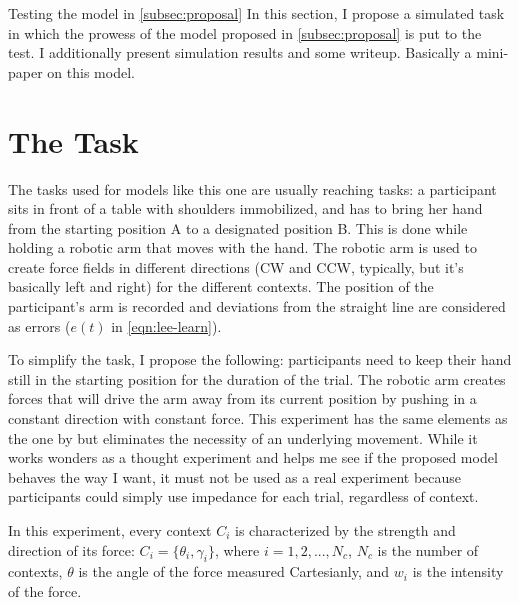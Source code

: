 \documentclass{report}
\begin{document}

\begin{chapter}{Testing the model in \ref{subsec:proposal}}
In this section, I propose a simulated task in which the prowess of the model proposed in \ref{subsec:proposal} is put to the test. I additionally present simulation results and some writeup. Basically a mini-paper on this model.

\section{The Task}
The tasks used for models like this one are usually \citep[e.g.][]{Lee_Dual_2009} reaching tasks: a participant sits in front of a table with shoulders immobilized, and has to bring her hand from the starting position A to a designated position B. This is done while holding a robotic arm that moves with the hand. The robotic arm is used to create force fields in different directions (CW and CCW, typically, but it's basically left and right) for the different contexts. The position of the participant's arm is recorded and deviations from the straight line are considered as errors ($e(t)$ in \ref{eqn:lee-learn}).

To simplify the task, I propose the following: participants need to keep their hand still in the starting position for the duration of the trial. The robotic arm creates forces that will drive the arm away from its current position by pushing in a constant direction with constant force. This experiment has the same elements as the one by \cite{Lee_Dual_2009} but eliminates the necessity of an underlying movement. While it works wonders as a thought experiment and helps me see if the proposed model behaves the way I want, it must not be used as a real experiment because participants could simply use impedance for each trial, regardless of context.

In this experiment, every context $C_i$ is characterized by the strength and direction of its force: $C_i = \{\theta_i, \gamma_i\}$, where $i = 1, 2, ..., N_c$, $N_c$ is the number of contexts, $\theta$ is the angle of the force measured Cartesianly, and $w_i$ is the intensity of the force.


\end{chapter}
\end{document}
